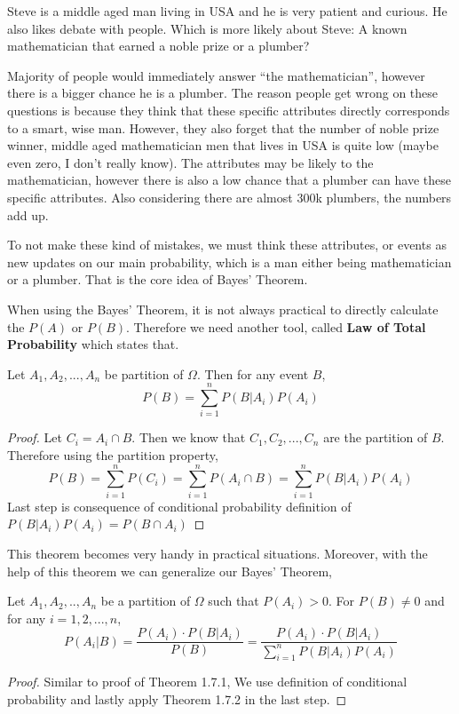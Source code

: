 \begin{example}
    Steve is a middle aged man  living in USA and he is very patient and curious. He also likes debate with people.  Which is more likely about Steve: A known mathematician that earned a noble prize or a plumber? 
    \newline
    \par
    Majority of people would immediately answer ``the mathematician'', however there is a bigger chance he is a plumber. The reason people get wrong on these questions is because they think that these specific attributes directly corresponds to a smart, wise man. However, they also forget that the number of  noble prize winner, middle aged mathematician men that lives in USA is quite low (maybe even zero, I don't really know).
    The attributes may be likely to the mathematician, however there is also a low chance that a plumber can have these specific attributes. Also considering there are almost $300$k plumbers, the numbers add up.

    \par 

    To not make these kind of mistakes, we must think these attributes, or events as new updates on our main probability, which is a man either being mathematician or a plumber. That is the core idea of Bayes' Theorem.
\end{example}

\par 

When using the Bayes' Theorem, it is not always practical to directly calculate the $P(A)$ or $P(B)$. Therefore we need another tool, called \textbf{Law of Total Probability} which states that.
\\
\begin{theorem} Let $A_1,A_2,...,A_n$ be partition of $\Omega$. Then for any event $B$,
    $$P(B)= \sum_{i=1}^n P(B|A_i)P(A_i)$$
    
\end{theorem}
\begin{proof}
    Let $C_i=A_i \cap B$. Then we know that $C_1,C_2,...,C_n$ are the partition of $B$. Therefore using the partition property,
    $$ P(B)= \sum_{i=1}^n P(C_i) = \sum_{i=1}^n P(A_i \cap B) =\sum_{i=1}^n P(B|A_i)P(A_i) $$
    Last step is consequence of conditional probability definition of $P(B|A_i)P(A_i)=P(B \cap A_i)$
\end{proof}

\par
This theorem becomes very handy in practical situations. Moreover, with the help of this theorem we can generalize our Bayes' Theorem,

\begin{theorem} Let $A_1,A_2,..,A_n$ be a partition of $\Omega$ such that $P(A_i) > 0$. For $P(B) \neq 0$ and for any $i=1,2,...,n$,
    $$ P(A_i|B) = \frac{P(A_i) \cdot P(B|A_i)}{P(B)} =  \frac{P(A_i) \cdot P(B|A_i)}{\sum_{i=1}^n P(B|A_i)P(A_i) }$$
\end{theorem}
\begin{proof}
    Similar to proof of Theorem 1.7.1, We use definition of conditional probability and  lastly apply Theorem 1.7.2  in the last step.
\end{proof}
